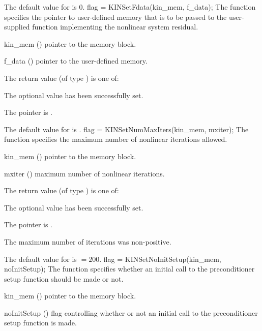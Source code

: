{
  The default value for  is $0$.
}
{
flag = KINSetFdata(kin\_mem, f\_data);
}
{
  The function  specifies the pointer to user-defined memory
  that is to be passed to the user-supplied function implementing the nonlinear
  system residual.
}
{
  \begin{args}
  \item[kin\_mem] ()
    pointer to the {\kinsol} memory block.
  \item[f\_data] ()
    pointer to the user-defined memory.
  \end{args}
}
{
  The return value  (of type ) is one of:
  \begin{args}
  \item[\Id{KIN\_SUCCESS}] 
    The optional value has been successfully set.
  \item[\Id{KIN\_MEM\_NULL}]
    The  pointer is .
  \end{args}
}
{
  The default value for  is .
}
{
flag = KINSetNumMaxIters(kin\_mem, mxiter);
}
{
  The function  specifies the maximum number of 
  nonlinear iterations allowed.
}
{
  \begin{args}
  \item[kin\_mem] ()
    pointer to the {\kinsol} memory block.
  \item[mxiter] ()
    maximum number of nonlinear iterations.
  \end{args}
}
{
  The return value  (of type ) is one of:
  \begin{args}
  \item[\Id{KIN\_SUCCESS}] 
    The optional value has been successfully set.
  \item[\Id{KIN\_MEM\_NULL}]
    The  pointer is .
  \item[\Id{KIN\_ILL\_INPUT}]
    The maximum number of iterations was non-positive.
  \end{args}
}
{
  The default value for  is  $=200$.
}
{
flag = KINSetNoInitSetup(kin\_mem, noInitSetup);
}
{
  The function  specifies whether an initial call
  to the preconditioner setup function should be made or not.
}
{
  \begin{args}[noInitSeti[]
  \item[kin\_mem] ()
    pointer to the {\kinsol} memory block.
  \item[noInitSetup] ()
    flag controlling whether or not an initial call 
    to the preconditioner setup function is made.
  \end{args}
}
